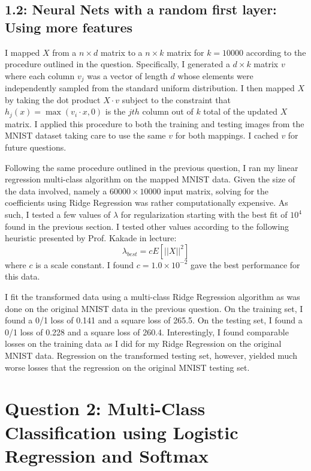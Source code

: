 \documentclass[12pt]{amsart}
\begin{document}
\subsection*{1.2: Neural Nets with a random first layer: Using more features}

I mapped $X$ from a $n \times d$ matrix to a $n \times k$ matrix for $k=10000$ according to the procedure outlined in the question.  Specifically, I generated a $d \times k$ matrix $v$ where each column $v_j$ was a vector of length $d$ whose elements were independently sampled from the standard uniform distribution.  I then mapped $X$ by taking the dot product $X \cdot v$ subject to the constraint that $h_j(x) = \max{(v_i \cdot x,0)}$ is the $jth$ column out of $k$ total of the updated $X$ matrix.  I applied this procedure to both the training and testing images from the MNIST dataset taking care to use the same $v$ for both mappings.  I cached $v$ for future questions.

Following the same procedure outlined in the previous question, I ran my linear regression multi-class algorithm on the mapped MNIST data.  Given the size of the data involved, namely a $60000 \times 10000$ input matrix, solving for the coefficients using Ridge Regression was rather computationally expensive.  As such, I tested a few values of $\lambda$ for regularization starting with the best fit of $10^4$ found in the previous section.  I tested other values according to the following heuristic presented by Prof. Kakade in lecture:
\begin{equation} \label{eqn:lambda_heuristic}
\lambda_{best} = c E[||X||^2]
\end{equation}
where $c$ is a scale constant.  I found $c = 1.0 \times 10^{-2}$ gave the best performance for this data.
 
I fit the transformed data using a multi-class Ridge Regression algorithm as was done on the original MNIST data in the previous question.  On the training set, I found a 0/1 loss of 0.141 and a square loss of 265.5.  On the testing set, I found a 0/1 loss of 0.228 and a square loss of 260.4.  Interestingly, I found comparable losses on the training data as I did for my Ridge Regression on the original MNIST data.  Regression on the transformed testing set, however, yielded much worse losses that the regression on the original MNIST testing set.

\section*{Question 2: Multi-Class Classification using Logistic Regression and Softmax}
\end{document}
